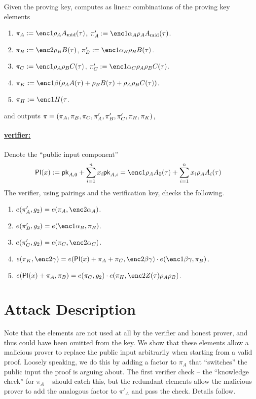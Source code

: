 \documentclass[11pt]{article}
\numberwithin{figure}{section} %
\begin{document}
Given the proving key, \per computes as linear combinations of the proving key elements
\begin{enumerate}
\item $\pi_A\defeq \enc1{\rho_A \Amid(\tau)}$, $\pi'_A\defeq \enc1{\alpha_A\rho_A \Amid(\tau)}$.
\item $\pi_B\defeq \enc2{\rho_B B(\tau)}$, $\pi'_B \defeq \enc1{\alpha_B\rho_B B(\tau)}$.
\item $\pi_C\defeq \enc1{\rho_A\rho_B C(\tau)}$, $\pi'_C \defeq \enc1{\alpha_C\rho_A\rho_B C(\tau)}$.
\item $\pi_K\defeq \enc1{\beta(\rho_A A(\tau) + \rho_B B(\tau) + \rho_A\rho_B C(\tau))}$.
\item $\pi_H\defeq \enc1{H(\tau}$.
 \end{enumerate}
 and outputs $\pi = (\pi_A,\pi_B,\pi_C,\pi'_A,\pi'_B,\pi'_C,\pi_H,\pi_K)$,
 

\paragraph{\underline{\bctv verifier:}\\}
Denote the ``public input component'' 
\[ \PI(x) \defeq \pk_{A,0} + \sum_{i=1}^n x_i \pk_{A,i} = \enc1{\rho_A A_0(\tau) + \sum_{i=1}^n x_i \rho_A A_i(\tau) }\]
 The verifier, using pairings and the verification key, checks the following.
\begin{enumerate}
 \item $e(\pi'_A,g_2)=e(\pi_A,\enc2{\alpha_A})$.
\item $e(\pi'_B, g_2)=e(\enc1{\alpha_B},\pi_B)$.
\item $e(\pi'_C,g_2)=e(\pi_C,\enc2{\alpha_C})$.
\item $e(\pi_K,\enc2{\gamma})=e(\PI(x)+\pi_A+\pi_C,\enc2{\beta\gamma})\cdot e(\enc1{\beta\gamma},\pi_B)$.
\item $e(\PI(x)+\pi_A,\pi_B)= e(\pi_C,g_2)\cdot e(\pi_H,\enc2{Z(\tau)\rho_A\rho_B})$.
 \end{enumerate}
 
 \section{Attack Description}\label{sec:attack}
 Note that the elements  are not used at all by the verifier and honest prover, and thus could have been omitted from the key. We show that these elements allow a malicious prover to replace the public input arbitrarily when starting from a valid proof.
 Loosely speaking, we do this by adding a factor to $\pi_A$ that ``switches'' the public input the proof is arguing about.
 The first verifier check -- the ``knowledge check'' for $\pi_A$ -- should catch this, but the redundant elements allow the malicious prover to add
 the analogous factor to $\pi'_A$ and pass the check. Details follow.
 
\end{document}
